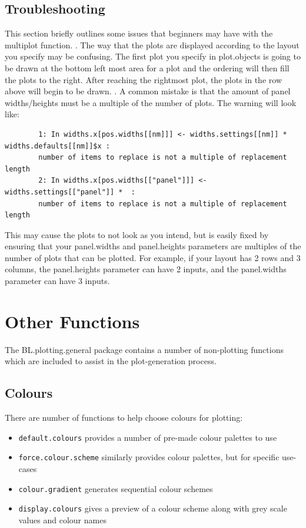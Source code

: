 \documentclass[letterpaper]{article}
\begin{document}
\subsection{Troubleshooting}
This section briefly outlines some issues that beginners may have with the multiplot function. 
\newline
{}. The way that the plots are displayed according to the layout you specify may be confusing. The first plot you specify in plot.objects is going to be drawn at the bottom left most area for a plot and the ordering will then fill the plots to the right. After reaching the rightmost plot, the plots in the row above will begin to be drawn. 
\newline
{}. A common mistake is that the amount of panel widths/heights must be a multiple of the number of plots. The warning will look like:

\begin{verbatim}
        1: In widths.x[pos.widths[[nm]]] <- widths.settings[[nm]] * widths.defaults[[nm]]$x : 
        number of items to replace is not a multiple of replacement length
        2: In widths.x[pos.widths[["panel"]]] <- widths.settings[["panel"]] *  :
        number of items to replace is not a multiple of replacement length
\end{verbatim}

This may cause the plots to not look as you intend, but is easily fixed by ensuring that your panel.widths and panel.heights parameters are multiples of the number of plots that can be plotted. For example, if your layout has 2 rows and 3 columns, the panel.heights parameter can have 2 inputs, and the panel.widths parameter can have 3 inputs.

\section{Other Functions}
The BL.plotting.general package contains a number of non-plotting functions which are included to assist in the plot-generation process. 

\subsection{Colours}
There are number of functions to help choose colours for plotting:
\begin{itemize}
\item \texttt{default.colours} provides a number of pre-made colour palettes to use
\item \texttt{force.colour.scheme} similarly provides colour palettes, but for specific use-cases
\item \texttt{colour.gradient} generates sequential colour schemes
\item \texttt{display.colours} gives a preview of a colour scheme along with grey scale values and colour names
\end{itemize}
\end{document}
